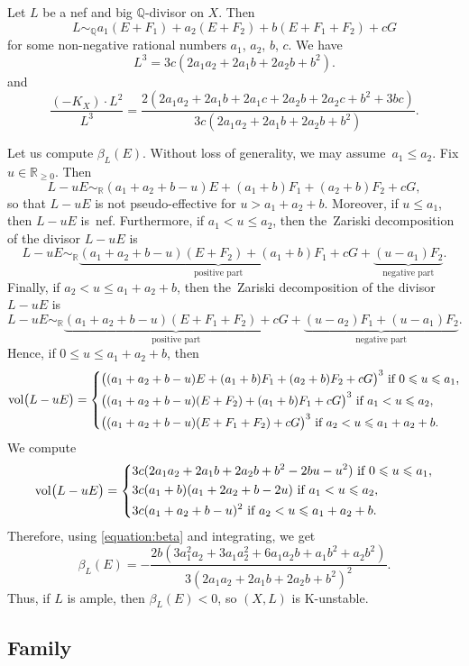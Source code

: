 \documentclass[12pt]{amsart}
\theoremstyle{definition}
\theoremstyle{remark}
\begin{document}
Let $L$ be a nef and big $\mathbb{Q}$-divisor on $X$.  Then
$$
L\sim_{\mathbb{Q}}a_1(E+F_1)+a_2(E+F_2)+b(E+F_1+F_2)+cG
$$
for some non-negative rational numbers $a_1$, $a_2$, $b$, $c$. We have
$$
L^3=3c(2a_1a_2+2a_1b+2a_2b+b^2).
$$
and
$$
\frac{(-K_X)\cdot L^2}{L^3}=\frac{2(2a_1a_2+2a_1b+2a_1c+2a_2b+2a_2c+b^2+3bc)}{3c(2a_1a_2+2a_1b+2a_2b+b^2)}.
$$

Let us compute $\beta_L(E)$. Without loss of generality, we may assume~$a_1\leqslant a_2$.
Fix $u\in\mathbb{R}_{\geqslant 0}$. Then
$$
L-uE\sim_{\mathbb{R}}(a_1+a_2+b-u)E+(a_1+b)F_1+(a_2+b)F_2+cG,
$$
so that $L-uE$ is not pseudo-effective for $u>a_1+a_2+b$.
Moreover, if $u\leqslant a_1$, then $L-uE$ is~nef.
Furthermore, if $a_1<u\leqslant a_2$, then the~Zariski decomposition of the divisor $L-uE$ is
$$
L-uE\sim_{\mathbb{R}}\underbrace{(a_1+a_2+b-u)(E+F_2)+(a_1+b)F_1+cG}_{\text{positive part}}+\underbrace{(u-a_1)F_2}_{\text{negative part}}.
$$
Finally, if $a_2<u\leqslant a_1+a_2+b$, then the~Zariski decomposition of the divisor $L-uE$ is
$$
L-uE\sim_{\mathbb{R}}\underbrace{(a_1+a_2+b-u)(E+F_1+F_2)+cG}_{\text{positive part}}+\underbrace{(u-a_2)F_1+(u-a_1)F_2}_{\text{negative part}}.
$$
Hence, if $0\leqslant u\leqslant a_1+a_2+b$, then
$$
\mathrm{vol}\big(L-uE\big)=
\left\{\aligned
&\big((a_1+a_2+b-u)E+(a_1+b)F_1+(a_2+b)F_2+cG\big)^3\ \text{if $0\leqslant u\leqslant a_1$}, \\
&\big((a_1+a_2+b-u)(E+F_2)+(a_1+b)F_1+cG\big)^3\ \text{if $a_1<u\leqslant a_2$},\\
&\big((a_1+a_2+b-u)(E+F_1+F_2)+cG\big)^3\ \text{if $a_2<u\leqslant a_1+a_2+b$}.
\endaligned
\right.
$$
We compute
$$
\mathrm{vol}\big(L-uE\big)=
\left\{\aligned
&3c(2a_1a_2+2a_1b+2a_2b+b^2-2bu-u^2)\ \text{if $0\leqslant u\leqslant a_1$}, \\
&3c(a_1+b)(a_1+2a_2+b-2u)\ \text{if $a_1<u\leqslant a_2$},\\
&3c(a_1+a_2+b-u)^2\ \text{if $a_2<u\leqslant a_1+a_2+b$}.
\endaligned
\right.
$$
Therefore, using \eqref{equation:beta} and integrating, we get
$$
\beta_L(E)=-\frac{2b(3a_1^2a_2+3a_1a_2^2+6a_1a_2b+a_1b^2+a_2b^2)}{3(2a_1a_2+2a_1b+2a_2b+b^2)^2}.
$$
Thus, if $L$ is ample, then $\beta_{L}(E)<0$, so $(X,L)$ is K-unstable.


\subsection{Family }
\label{subsection:4-11}
\end{document}
